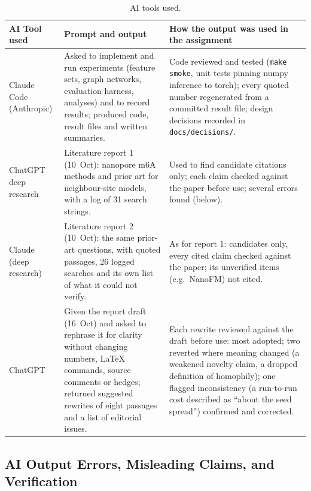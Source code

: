 \documentclass[11pt,a4paper]{article}
\begin{document}
\begin{table}[H]
    \centering\small
    \begin{tabularx}{\linewidth}{>{\raggedright\arraybackslash}p{2.3cm}YY}
        \toprule
        \textbf{AI Tool used} & \textbf{Prompt and output} & \textbf{How the output was used in the assignment} \\
        \midrule
        Claude Code (Anthropic) & Asked to implement and run experiments (feature sets, graph networks, evaluation harness, analyses) and to record results; produced code, result files and written summaries. & Code reviewed and tested (\texttt{make smoke}, unit tests pinning numpy inference to torch); every quoted number regenerated from a committed result file; design decisions recorded in \texttt{docs/decisions/}. \\
        ChatGPT deep research & Literature report 1 (10~Oct): nanopore m6A methods and prior art for neighbour-site models, with a log of 31 search strings. & Used to find candidate citations only; each claim checked against the paper before use; several errors found (below). \\
        Claude (deep research) & Literature report 2 (10~Oct): the same prior-art questions, with quoted passages, 26 logged searches and its own list of what it could not verify. & As for report 1: candidates only, every cited claim checked against the paper; its unverified items (e.g.\ NanoFM) not cited. \\
        ChatGPT & Given the report draft (16~Oct) and asked to rephrase it for clarity without changing numbers, LaTeX commands, source comments or hedges; returned suggested rewrites of eight passages and a list of editorial issues. & Each rewrite reviewed against the draft before use: most adopted; two reverted where meaning changed (a weakened novelty claim, a dropped definition of homophily); one flagged inconsistency (a run-to-run cost described as ``about the seed spread'') confirmed and corrected. \\        \bottomrule
    \end{tabularx}
    \caption{AI tools used.}
    \label{tab:ai_usage}
\end{table}

\subsection*{AI Output Errors, Misleading Claims, and Verification}
\end{document}
